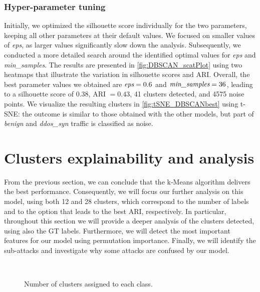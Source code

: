 \documentclass[acmlarge,nonacm]{acmart}
\begin{document}
\subsubsection{Hyper-parameter tuning}
Initially, we optimized the silhouette score individually for the two parameters, keeping all other parameters at their default values. We focused on smaller values of \emph{eps}, as larger values significantly slow down the analysis. Subsequently, we conducted a more detailed search around the identified optimal values for \emph{eps} and \emph{min\_samples}. 
The results are presented in \cref{fig:DBSCAN_scatPlot} using two heatmaps that illustrate the variation in silhouette scores and ARI. Overall, the best parameter values we obtained are $\emph{eps}=0.6$ and $\emph{min\_samples}=36$, leading to a silhouette score of $0.38$, ARI $=0.43$, 41 clusters detected, and 4575 noise points. We visualize the resulting clusters in \cref{fig:tSNE_DBSCANbest} using t-SNE: the outcome is similar to those obtained with the other models, but part of \emph{benign} and \emph{ddos\_syn} traffic is classified as noise.

\section{Clusters explainability and analysis} \label{sec:clusterExplainability}
\label{sec:clustersAnalysis}
From the previous section, we can conclude that the k-Means algorithm delivers the best performance. Consequently, we will focus our further analysis on this model, using both 12 and 28 clusters, which correspond to the number of labels and to the option that leads to the best ARI, respectively. In particular, throughout this section we will provide a deeper analysis of the clusters detected, using also the GT labels. Furthermore, we will detect the most important features for our model using permutation importance. Finally, we will identify the sub-attacks and investigate why some attacks are confused by our model. 
\begin{figure}
	\centering
     \quad
	 \\
  	\caption{Number of clusters assigned to each class.}  \label{fig:ECDFclasses_clusters}
\end{figure}
\end{document}
